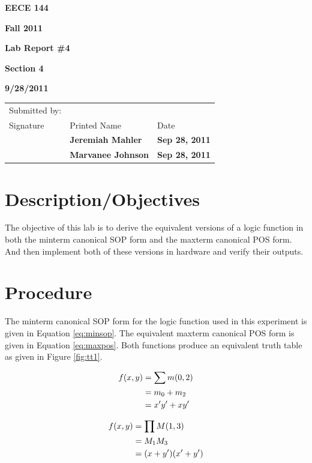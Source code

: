 \documentclass[12pt]{article}
\begin{document}

\centerline{\bf EECE 144}
\centerline{\bf Fall 2011}
\centerline{\bf}
\centerline{\bf Lab Report \#4}
\centerline{\bf Section 4}
\centerline{\bf 9/28/2011}

\begin{center}
\begin{tabularx}{\textwidth}[b]{X l l}
Submitted by: & & \\
Signature & Printed Name & Date \\
\hline
\multicolumn{1}{|X|}{} & \multicolumn{1}{|l|}{\bigstrut \bf Jeremiah Mahler} & \multicolumn{1}{|l|}{\bf Sep 28, 2011} \\
\hline
\multicolumn{1}{|X|}{} & \multicolumn{1}{|l|}{\bigstrut \bf Marvanee Johnson} & \multicolumn{1}{|l|}{\bf Sep 28, 2011} \\
\hline
\end{tabularx}
\end{center}

\section{Description/Objectives}

The objective of this lab is to derive the equivalent versions
of a logic function in both the minterm canonical SOP
form and the maxterm canonical POS form.
And then implement both of these versions in hardware and
verify their outputs.

\section{Procedure}
\label{sec:plan}

The minterm canonical SOP form for the logic function used in this
experiment is given in Equation \ref{eq:minsop}.
The equivalent maxterm canonical POS form is given in Equation \ref{eq:maxpos}.
Both functions produce an equivalent truth table as given in Figure \ref{fig:tt1}.
\nocite{roth2009fundamentals}

\begin{align}
f(x, y) &= \sum m(0, 2) \label{eq:minsop} \\
	    &= m_0 + m_2 \notag \\
		&= x' y' + x y' \notag
\end{align}

\begin{align}
f(x, y) &= \prod M(1, 3) \label{eq:maxpos} \\
	 &= M_1 M_3 \notag \\
	 &= (x + y')(x' + y') \notag
\end{align}
\end{document}
